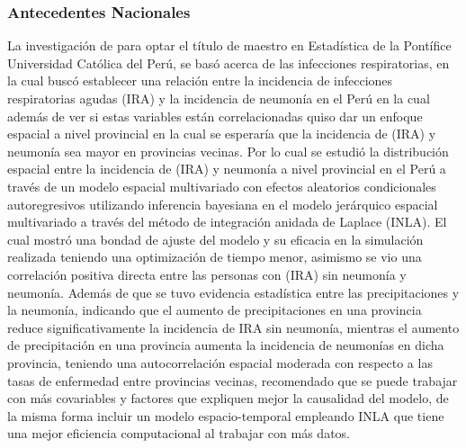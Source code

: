 \subsubsection{Antecedentes Nacionales}
La investigación de \cite{lopezmodelamiento} para optar el título de maestro en Estadística de la Pontífice Universidad Católica del Perú, se basó acerca de las infecciones respiratorias, en la cual buscó establecer una relación entre la incidencia de infecciones respiratorias agudas (IRA) y la incidencia de neumonía en el Perú en la cual además de ver si estas variables están correlacionadas quiso dar un enfoque espacial a nivel provincial en la cual se esperaría que la incidencia de (IRA) y neumonía sea mayor en provincias vecinas. Por lo cual se estudió la distribución espacial entre la incidencia de (IRA) y neumonía a nivel provincial en el Perú a través de un modelo espacial multivariado con efectos aleatorios condicionales autoregresivos utilizando inferencia bayesiana en el modelo jerárquico espacial multivariado a través del método de integración anidada de Laplace (INLA). El cual mostró una bondad de ajuste del modelo y su eficacia en la simulación realizada teniendo una optimización de tiempo menor, asimismo se vio una correlación positiva directa entre las personas con (IRA) sin neumonía y neumonía. Además de que se tuvo evidencia estadística entre las precipitaciones y la neumonía, indicando que el aumento de precipitaciones en una provincia reduce significativamente la incidencia de IRA sin neumonía, mientras el aumento de precipitación en una provincia aumenta la incidencia de neumonías en dicha provincia, teniendo una autocorrelación espacial moderada con respecto a las tasas de enfermedad entre provincias vecinas, recomendado que se puede trabajar con más covariables y factores que expliquen mejor la causalidad del modelo, de la misma forma incluir un modelo espacio-temporal empleando INLA que tiene una mejor eficiencia computacional al trabajar con más datos.

























